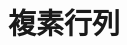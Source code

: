 \documentclass[../../topic_linear-algebra]{subfiles}
\begin{document}
\chapter{複素行列}
\end{document}
